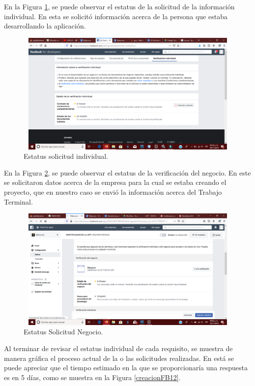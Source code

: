 	En la Figura \ref{creacionFB9}, se puede observar el estatus de la solicitud de la información individual. En esta se solicitó información acerca de la persona que estaba desarrollando la aplicación.
	\begin{figure}[hbt!]
		\centering
		\includegraphics[width=15cm, height=6cm]{Imagenes/FacebookAPI/Facebook9}
		\caption{Estatus solicitud individual.}
		\label{creacionFB9}
	\end{figure}

	En la Figura \ref{creacionFB11}, se puede observar el estatus de la verificación del negocio. En este se solicitaron datos acerca de la empresa para la cual se estaba creando el proyecto, que en nuestro caso se envió la información acerca del Trabajo Terminal.
	\begin{figure}[hbt!]
		\centering
		\includegraphics[width=15cm, height=6cm]{Imagenes/FacebookAPI/Facebook11}
		\caption{Estatus Solicitud Negocio.}
		\label{creacionFB11}
	\end{figure}
\pagebreak
	Al terminar de revisar el estatus individual de cada requisito, se muestra de manera gráfica el proceso actual de la o las solicitudes realizadas. En está se puede apreciar que el tiempo estimado en la que se proporcionaría una respuesta es en 5 días, como se muestra en la Figura \ref{creacionFB12}.

